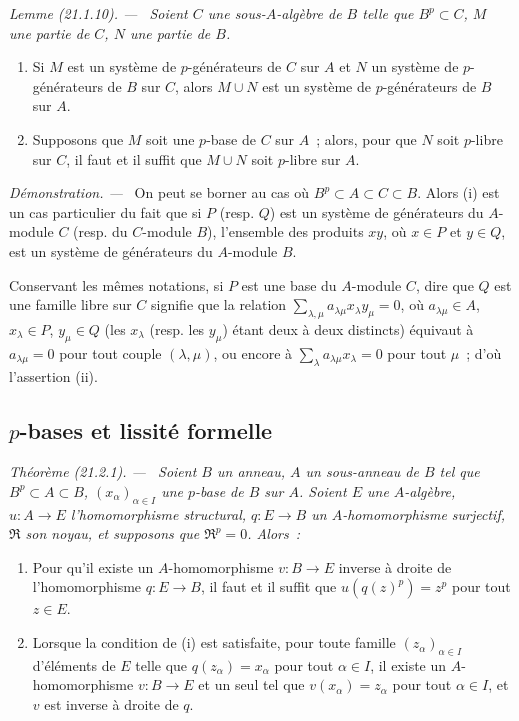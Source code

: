 \documentclass[10pt,oneside]{book}
\makeatletter
\newcommand{\setmanualcurrentlabel}[1]{\def\@currentlabel{#1}}
\newcommand{\oldpage}[2][]{%
  \setcounter{footnote}{0}%
  \marginpar{\scriptsize\textbf{#1}~|~#2}\ignorespaces}
\newenvironment{theorem}[1][]{%
  \setmanualcurrentlabel{#1}\par\medskip\noindent\itshape Théorème (#1). ---\ }{\par}
\newenvironment{lemma}[1][]{%
  \setmanualcurrentlabel{#1}\par\medskip\noindent\itshape Lemme (#1). ---\ }{\par}
\newenvironment{proof}{%
  \par\medskip\noindent\textit{Démonstration. ---\ }}{\par}
\makeatother
\begin{document}
\oldpage[0\textsubscript{IV-1}]{157}
\begin{lemma}[21.1.10]
\label{0.21.1.10-fr}
Soient $C$ une sous-$A$-algèbre de $B$ telle que $B^p\subset C$, $M$ une
partie de $C$, $N$ une partie de $B$.
\begin{enumerate}
  \item[(i)] Si $M$ est un système de $p$-générateurs de $C$ sur $A$ et $N$
  un système de $p$-générateurs de $B$ sur $C$, alors $M\cup N$ est un système
  de $p$-générateurs de $B$ sur $A$.
  \item[(ii)] Supposons que $M$ soit une $p$-base de $C$ sur $A$~; alors,
  pour que $N$ soit $p$-libre sur $C$, il faut et il suffit que $M\cup N$
  soit $p$-libre sur $A$.
\end{enumerate}
\end{lemma}

\begin{proof}
On peut se borner au cas où $B^p\subset A\subset C\subset B$. Alors (i)
est un cas particulier du fait que si $P$ (resp. $Q$) est un système de
générateurs du $A$-module $C$ (resp. du $C$-module $B$), l'ensemble des
produits $xy$, où $x\in P$ et $y\in Q$, est un système de générateurs du
$A$-module $B$.

Conservant les mêmes notations, si $P$ est une base du $A$-module $C$,
dire que $Q$ est une famille libre sur $C$ signifie que la relation
$\sum_{\lambda,\mu}a_{\lambda\mu}x_\lambda y_\mu=0$, où
$a_{\lambda\mu}\in A$, $x_\lambda\in P$, $y_\mu\in Q$ (les $x_\lambda$
(resp. les $y_\mu$) étant deux à deux distincts) équivaut à
$a_{\lambda\mu}=0$ pour tout couple $(\lambda,\mu)$, ou encore à
$\sum_\lambda a_{\lambda\mu}x_\lambda=0$ pour tout $\mu$~; d'où
l'assertion (ii).
\end{proof}

\subsection{$p$-bases et lissité formelle}
\label{0.21.2-fr}

\begin{theorem}[21.2.1]
\label{0.21.2.1-fr}
Soient $B$ un anneau, $A$ un sous-anneau de $B$ tel que $B^p\subset A\subset B$,
$(x_\alpha)_{\alpha\in I}$ une $p$-base de $B$ sur $A$.
Soient $E$ une $A$-algèbre, $u:A\to E$ l'homomorphisme structural,
$q:E\to B$ un $A$-homomorphisme surjectif, $\mathfrak R$ son noyau, et
supposons que $\mathfrak R^p=0$. Alors~:
\begin{enumerate}
  \item[(i)] Pour qu'il existe un $A$-homomorphisme $v:B\to E$ inverse à
  droite de l'homomorphisme $q:E\to B$, il faut et il suffit que
  $u(q(z)^p)=z^p$ pour tout $z\in E$.
  \item[(ii)] Lorsque la condition de (i) est satisfaite, pour toute famille
  $(z_\alpha)_{\alpha\in I}$ d'éléments de $E$ telle que
  $q(z_\alpha)=x_\alpha$ pour tout $\alpha\in I$, il existe un
  $A$-homomorphisme $v:B\to E$ et un seul tel que $v(x_\alpha)=z_\alpha$
  pour tout $\alpha\in I$, et $v$ est inverse à droite de $q$.
\end{enumerate}
\end{theorem}
\end{document}
